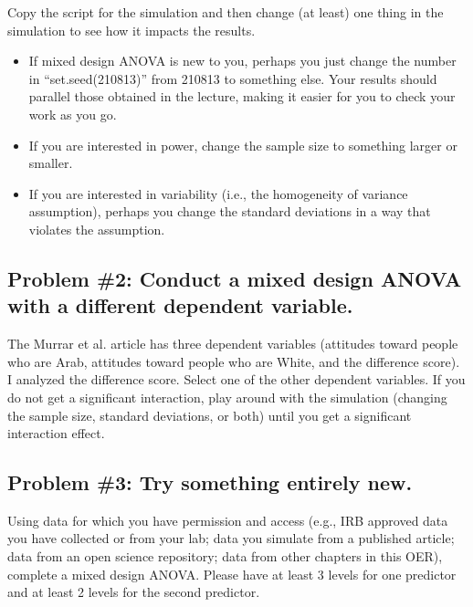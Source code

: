 \documentclass[
  11pt,
]{book}
\providecommand{\tightlist}{%
  \setlength{\itemsep}{0pt}\setlength{\parskip}{0pt}}
\begin{document}
Copy the script for the simulation and then change (at least) one thing in the simulation to see how it impacts the results.

\begin{itemize}
\tightlist
\item
  If mixed design ANOVA is new to you, perhaps you just change the number in ``set.seed(210813)'' from 210813 to something else. Your results should parallel those obtained in the lecture, making it easier for you to check your work as you go.
\item
  If you are interested in power, change the sample size to something larger or smaller.
\item
  If you are interested in variability (i.e., the homogeneity of variance assumption), perhaps you change the standard deviations in a way that violates the assumption.
\end{itemize}

\hypertarget{problem-2-conduct-a-mixed-design-anova-with-a-different-dependent-variable.}{%
\subsection{Problem \#2: Conduct a mixed design ANOVA with a different dependent variable.}\label{problem-2-conduct-a-mixed-design-anova-with-a-different-dependent-variable.}}

The Murrar et al. \citeyearpar{murrar_entertainment-education_2018} article has three dependent variables (attitudes toward people who are Arab, attitudes toward people who are White, and the difference score). I analyzed the difference score. Select one of the other dependent variables. If you do not get a significant interaction, play around with the simulation (changing the sample size, standard deviations, or both) until you get a significant interaction effect.

\hypertarget{problem-3-try-something-entirely-new.-2}{%
\subsection{Problem \#3: Try something entirely new.}\label{problem-3-try-something-entirely-new.-2}}

Using data for which you have permission and access (e.g., IRB approved data you have collected or from your lab; data you simulate from a published article; data from an open science repository; data from other chapters in this OER), complete a mixed design ANOVA. Please have at least 3 levels for one predictor and at least 2 levels for the second predictor.
\end{document}

